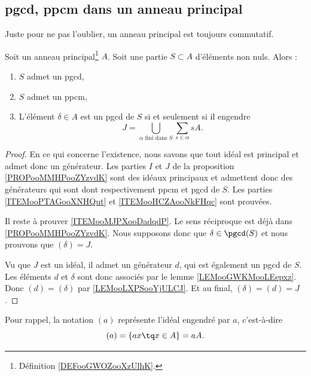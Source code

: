 \subsection{pgcd, ppcm dans un anneau principal}

Juste pour ne pas l'oublier, un anneau principal est toujours commutatif.


\begin{proposition}	\label{PROPooPZXNooNpVZCm}
	Soit un anneau principal\footnote{Définition \ref{DEFooGWOZooXzUlhK}.} \( A\). Soit une partie \( S\subset A\) d'éléments non nuls. Alors :
	\begin{enumerate}
		\item		\label{ITEMooPTAGooXNHQut}
		      \( S\) admet un pgcd,
		\item		\label{ITEMooHCZAooNkFHqc}
		      \( S\) admet un ppcm,
		\item		\label{ITEMooMJPXooDadqdP}
		      L'élément \( \delta\in A\) est un pgcd de \( S\) si et seulement si il engendre
		      \begin{equation}
			      J=\bigcup_{\alpha\text{ fini dans } S}\sum_{s\in \alpha}sA.
		      \end{equation}
	\end{enumerate}
\end{proposition}

\begin{proof}
	En ce qui concerne l'existence, nous savons que tout idéal est principal et admet donc un générateur. Les parties \( I\) et \( J\) de la proposition \ref{PROPooMMHPooZYzvdK} sont des idéaux principaux et admettent donc des générateurs qui sont dont respectivement ppcm et pgcd de \( S\). Les parties \ref{ITEMooPTAGooXNHQut} et \ref{ITEMooHCZAooNkFHqc} sont prouvées.

	Il reste à prouver \ref{ITEMooMJPXooDadqdP}. Le sens réciproque est déjà dans \ref{PROPooMMHPooZYzvdK}. Nous supposons donc que \( \delta\in\pgcd(S)\) et nous prouvons que \( (\delta)=J\).

	Vu que \( J\) est un idéal, il admet un générateur \( d\), qui est également un pgcd de \( S\). Les éléments \( d\) et \( \delta\) sont donc associés par le lemme \ref{LEMooGWKMooLEepxz}. Donc \( (d)=(\delta)\) par \ref{LEMooLXPSooYjULCJ}. Et au final, \( (\delta)=(d)=J\).
\end{proof}

Pour rappel, la notation \( (a)\) représente l'idéal engendré par \( a\), c'est-à-dire
\begin{equation}
	(a)=\{ ax\tq x\in A \}=aA.
\end{equation}




